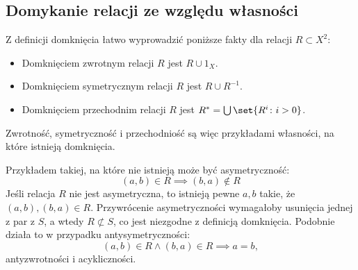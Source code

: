 \subsection{Domykanie relacji ze względu własności}
Z definicji domknięcia łatwo wyprowadzić poniższe fakty dla relacji \( R \subset X^2 \):
\begin{itemize}
    \item Domknięciem zwrotnym relacji \( R \) jest \( R \cup 1_X \).
    \item Domknięciem symetrycznym relacji \( R \) jest \( R \cup R^{-1} \).
    \item Domknięciem przechodnim relacji \( R \) jest \( R^{*} = \bigcup\set{R^i \colon i > 0} \).
\end{itemize}
Zwrotność, symetryczność i przechodniość są więc przykładami własności, na które istnieją domknięcia.

Przykładem takiej, na które nie istnieją może być asymetryczność:
\[
    (a, b) \in R \implies (b, a) \notin R
\]
Jeśli relacja \( R \) nie jest asymetryczna, to istnieją pewne \( a, b \) takie, że \( (a, b), (b, a) \in R \).
Przywrócenie asymetryczności wymagałoby usunięcia jednej z par z \( S \), a wtedy \( R \not\subset S \), co jest niezgodne z definicją domknięcia.
Podobnie działa to w przypadku antysymetryczności:
\[
    (a, b) \in R \land (b, a) \in R \implies a = b,
\]
antyzwrotności i acykliczności.